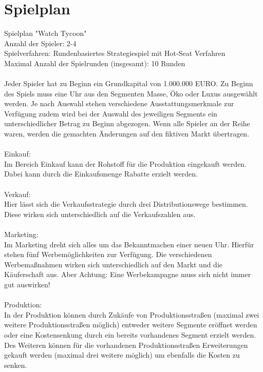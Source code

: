 \clearpage
\chapter{Spielplan}
Spielplan "Watch Tycoon" \\
Anzahl der Spieler: 2-4 \\
Spielverfahren: Rundenbasiertes Strategiespiel mit Hot-Seat Verfahren \\
Maximal Anzahl der Spielrunden (insgesamt): 10 Runden \\
\\
Jeder Spieler hat zu Beginn ein Grundkapital von 1.000.000 EURO. Zu Beginn des Spiels muss eine Uhr aus den Segmenten Masse, Öko oder Luxus ausgewählt werden. Je nach Auswahl stehen verschiedene Ausstattungsmerkmale zur Verfügung zudem wird bei der Auswahl des jeweiligen Segments ein unterschiedlicher Betrag zu Beginn abgezogen. Wenn alle Spieler an der Reihe waren, werden die gemachten Änderungen auf den fiktiven Markt übertragen. \\ 
\\
Einkauf:\\
Im Bereich Einkauf kann der Rohstoff für die Produktion eingekauft werden. Dabei kann durch die Einkaufsmenge Rabatte erzielt werden. \\
\\
Verkauf: \\
Hier lässt sich die Verkaufsstrategie durch drei Distributionswege bestimmen. Diese wirken sich unterschiedlich auf die Verkaufszahlen aus.\\
\\
Marketing:\\
Im Marketing dreht sich alles um das Bekanntmachen einer neuen Uhr. Hierfür stehen fünf Werbemöglichkeiten zur Verfügung. Die verschiedenen Werbemaßnahmen wirken sich unterschiedlich auf den Markt und die Käuferschaft aus. Aber Achtung: Eine Werbekampagne muss sich nicht immer gut auswirken!\\ 
\\
Produktion: \\
In der Produktion können durch Zukäufe von Produktionsstraßen (maximal zwei weitere Produktionsstraßen möglich) entweder weitere Segmente eröffnet werden oder eine Kostensenkung durch ein bereits vorhandenes Segment erzielt werden. Des Weiteren können für die vorhandenen Produktionsstraßen Erweiterungen gekauft werden (maximal drei weitere möglich) um ebenfalls die Kosten zu senken. \\ 
\\
